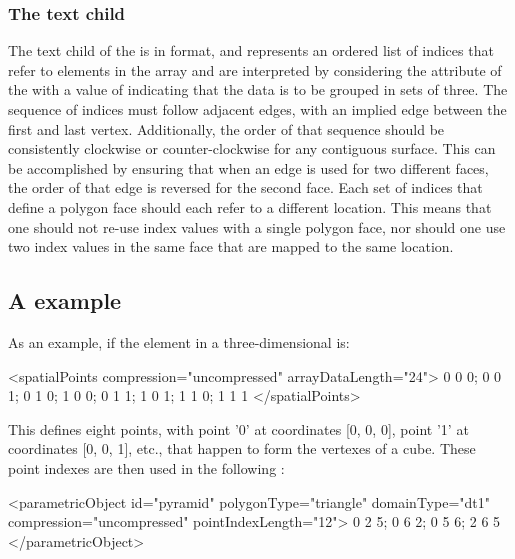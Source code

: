 \subsubsection{The \fixttspace{} text child}
The  text child of the \ParametricObject is in  format, and represents an ordered list of indices that refer to elements in the \SpatialPoints array and are interpreted by considering the  attribute of the \ParametricObject with a value of  indicating that the data is to be grouped in sets of three.  The sequence of indices must follow adjacent edges, with an implied edge between the first and last vertex.  Additionally, the order of that sequence should be consistently clockwise or counter-clockwise for any contiguous surface.  This can be accomplished by ensuring that when an edge is used for two different faces, the order of that edge is reversed for the second face.    Each set of indices that define a polygon face should each refer to a different location.  This means that one should not re-use index values with a single polygon face, nor should one use two index values in the same face that are mapped to the same location.

\subsection{A  example}
\label{parametricgeometry-example}

As an example, if the \SpatialPoints element in a three-dimensional \Geometry is:

\begin{example}
    <spatialPoints compression="uncompressed" arrayDataLength="24">
        0 0 0; 0 0 1; 0 1 0; 1 0 0; 0 1 1; 1 0 1; 1 1 0; 1 1 1
    </spatialPoints>
\end{example}

This defines eight points, with point '0' at coordinates [0, 0, 0], point '1' at coordinates [0, 0, 1], etc., that happen to form the vertexes of a cube.  These point indexes are then used in the following \ParametricObject:

\begin{example}
    <parametricObject id="pyramid" polygonType="triangle" domainType="dt1"
                      compression="uncompressed" pointIndexLength="12">
        0 2 5; 0 6 2; 0 5 6; 2 6 5
    </parametricObject>
\end{example}

